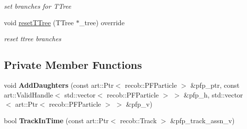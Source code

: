 \begin{DoxyCompactItemize}
\begin{DoxyCompactList}\small\item\em set branches for T\-Tree \end{DoxyCompactList}\item 
\hypertarget{classanalysis_1_1ObviousCosmicFlashMatching_a8de3a3d2c1688baf8ba9b08dc8566498}{void \hyperlink{classanalysis_1_1ObviousCosmicFlashMatching_a8de3a3d2c1688baf8ba9b08dc8566498}{reset\-T\-Tree} (T\-Tree $\ast$\-\_\-tree) override}\label{classanalysis_1_1ObviousCosmicFlashMatching_a8de3a3d2c1688baf8ba9b08dc8566498}

\begin{DoxyCompactList}\small\item\em reset ttree branches \end{DoxyCompactList}\end{DoxyCompactItemize}
\subsection*{Private Member Functions}
\begin{DoxyCompactItemize}
\item 
\hypertarget{classanalysis_1_1ObviousCosmicFlashMatching_a6a39083532d8b742b9f490d99c8f6ba2}{void {\bfseries Add\-Daughters} (const art\-::\-Ptr$<$ recob\-::\-P\-F\-Particle $>$ \&pfp\-\_\-ptr, const art\-::\-Valid\-Handle$<$ std\-::vector$<$ recob\-::\-P\-F\-Particle $>$ $>$ \&pfp\-\_\-h, std\-::vector$<$ art\-::\-Ptr$<$ recob\-::\-P\-F\-Particle $>$ $>$ \&pfp\-\_\-v)}\label{classanalysis_1_1ObviousCosmicFlashMatching_a6a39083532d8b742b9f490d99c8f6ba2}

\item 
\hypertarget{classanalysis_1_1ObviousCosmicFlashMatching_a4eaa251b09b9ede8ddf15abfe54acb5d}{bool {\bfseries Track\-In\-Time} (const art\-::\-Ptr$<$ recob\-::\-Track $>$ \&pfp\-\_\-track\-\_\-assn\-\_\-v)}\label{classanalysis_1_1ObviousCosmicFlashMatching_a4eaa251b09b9ede8ddf15abfe54acb5d}

\end{DoxyCompactItemize}

